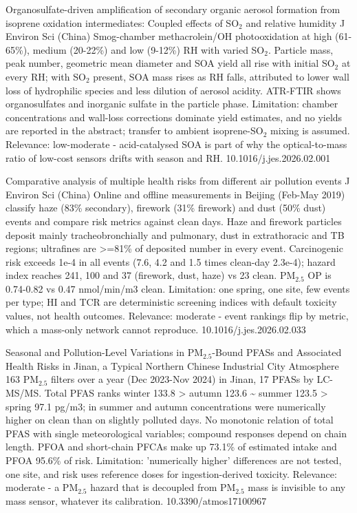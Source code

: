 \documentclass[10pt]{article}
\begin{document}
{Organosulfate-driven amplification of secondary organic aerosol formation from isoprene oxidation intermediates: Coupled effects of SO$_2$ and relative humidity}
{J Environ Sci (China)}
{Smog-chamber methacrolein/OH photooxidation at high (61-65\%), medium (20-22\%) and low (9-12\%) RH with varied SO$_2$. Particle mass, peak number, geometric mean diameter and SOA yield all rise with initial SO$_2$ at every RH; with SO$_2$ present, SOA mass rises as RH falls, attributed to lower wall loss of hydrophilic species and less dilution of aerosol acidity. ATR-FTIR shows organosulfates and inorganic sulfate in the particle phase. Limitation: chamber concentrations and wall-loss corrections dominate yield estimates, and no yields are reported in the abstract; transfer to ambient isoprene-SO$_2$ mixing is assumed. Relevance: low-moderate - acid-catalysed SOA is part of why the optical-to-mass ratio of low-cost sensors drifts with season and RH.}
{10.1016/j.jes.2026.02.001}

{Comparative analysis of multiple health risks from different air pollution events}
{J Environ Sci (China)}
{Online and offline measurements in Beijing (Feb-May 2019) classify haze (83\% secondary), firework (31\% firework) and dust (50\% dust) events and compare risk metrics against clean days. Haze and firework particles deposit mainly tracheobronchially and pulmonary, dust in extrathoracic and TB regions; ultrafines are >=81\% of deposited number in every event. Carcinogenic risk exceeds 1e-4 in all events (7.6, 4.2 and 1.5 times clean-day 2.3e-4); hazard index reaches 241, 100 and 37 (firework, dust, haze) vs 23 clean. PM$_{2.5}$ OP is 0.74-0.82 vs 0.47 nmol/min/m3 clean. Limitation: one spring, one site, few events per type; HI and TCR are deterministic screening indices with default toxicity values, not health outcomes. Relevance: moderate - event rankings flip by metric, which a mass-only network cannot reproduce.}
{10.1016/j.jes.2026.02.033}

{Seasonal and Pollution-Level Variations in PM$_{2.5}$-Bound PFASs and Associated Health Risks in Jinan, a Typical Northern Chinese Industrial City}
{Atmosphere}
{163 PM$_{2.5}$ filters over a year (Dec 2023-Nov 2024) in Jinan, 17 PFASs by LC-MS/MS. Total PFAS ranks winter 133.8 > autumn 123.6 \textasciitilde{} summer 123.5 > spring 97.1 pg/m3; in summer and autumn concentrations were numerically higher on clean than on slightly polluted days. No monotonic relation of total PFAS with single meteorological variables; compound responses depend on chain length. PFOA and short-chain PFCAs make up 73.1\% of estimated intake and PFOA 95.6\% of risk. Limitation: 'numerically higher' differences are not tested, one site, and risk uses reference doses for ingestion-derived toxicity. Relevance: moderate - a PM$_{2.5}$ hazard that is decoupled from PM$_{2.5}$ mass is invisible to any mass sensor, whatever its calibration.}
{10.3390/atmos17100967}
\end{document}
